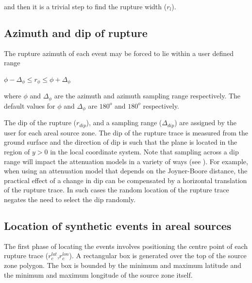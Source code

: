 and then it is a trivial step to find the rupture width ($r_l$).

\subsection{Azimuth and dip of rupture}
\label{sec:az-dip-rupture}

The rupture azimuth of each event may be forced to lie within a
user defined range
\begin{center} $\phi - \Delta_{\phi} \leq r_\phi \leq \phi + \Delta_{\phi}$ \end{center}
where $\phi$ and $\Delta_{\phi}$ are the azimuth and azimuth sampling range respectively. The
default values for $\phi$ and $\Delta_{\phi}$ are $180^o$ and $180^o$
respectively. 

The dip of the rupture ($r_{dip}$), and a sampling range ($\Delta_{dip}$) are assigned by the 
user for each areal source zone. The dip of the rupture trace is measured from the
ground surface and the direction of dip is such that the plane is
located in the region of $y>0$ in the local coordinate system.
Note that sampling across a dip range will impact the attenuation models in a variety of ways (see ). 
For example, when using an attenuation model that depends 
on the Joyner-Boore distance, the practical effect of a change in dip can be compensated by a
horizontal translation of the rupture trace. In such cases the random
location of the rupture trace negates the need to select the dip randomly.

\subsection{Location of synthetic events in areal sources}
\label{sec:areal_locn}

The first phase of locating the events involves positioning the
centre point of each rupture trace ($r_c^{lat}$,$r_c^{lon}$). A
rectangular box is generated over the top of the source zone polygon. The
box is bounded by the minimum and maximum latitude and the
minimum and maximum longitude of the source zone itself. 


